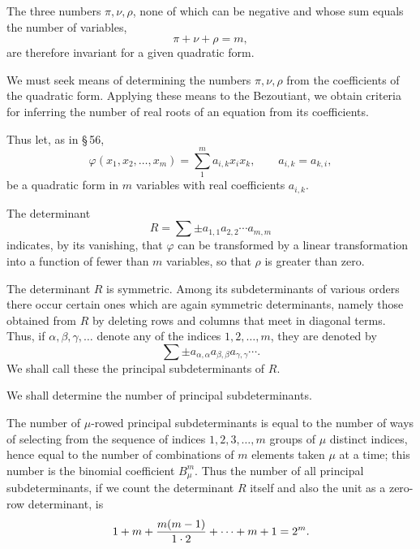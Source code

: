 \documentclass[11pt]{article}
\begin{document}
The three numbers $\pi,\nu,\rho$, none of which can be negative and whose sum equals the number of variables,
\begin{equation}
        \pi+\nu+\rho=m,
\tag{1}
\end{equation}
are therefore invariant for a given quadratic form.

We must seek means of determining the numbers $\pi,\nu,\rho$ from the coefficients of the quadratic form. Applying these means to the Bezoutiant, we obtain criteria for inferring the number of real roots of an equation from its coefficients.

Thus let, as in \S\,56,
\begin{equation}
        \varphi(x_1,x_2,\ldots,x_m)=\sum_{1}^{m}a_{i,k}x_ix_k,
        \qquad a_{i,k}=a_{k,i},
\tag{2}
\end{equation}
be a quadratic form in $m$ variables with real coefficients $a_{i,k}$.

The determinant
\begin{equation}
        R=\sum \pm a_{1,1}a_{2,2}\cdots a_{m,m}
\tag{3}
\end{equation}
indicates, by its vanishing, that $\varphi$ can be transformed by a linear transformation into a function of fewer than $m$ variables, so that $\rho$ is greater than zero.

The determinant $R$ is symmetric. Among its subdeterminants of various orders there occur certain ones which are again symmetric determinants, namely those obtained from $R$ by deleting rows and columns that meet in diagonal terms. Thus, if $\alpha,\beta,\gamma,\ldots$ denote any of the indices $1,2,
\ldots,m$, they are denoted by
\begin{equation}
        \sum\pm a_{\alpha,\alpha}a_{\beta,\beta}a_{\gamma,\gamma}\cdots.
\tag{4}
\end{equation}
We shall call these the principal subdeterminants of $R$.

We shall determine the number of principal subdeterminants.

The number of $\mu$-rowed principal subdeterminants is equal to the number of ways of selecting from the sequence of indices $1,2,3,\ldots,m$ groups of $\mu$ distinct indices, hence equal to the number of combinations of $m$ elements taken $\mu$ at a time; this number is the binomial coefficient $B^m_\mu$. Thus the number of all principal subdeterminants, if we count the determinant $R$ itself and also the unit as a zero-row determinant, is
\[
        1+m+{m(m-1)\over 1\cdot 2}+\cdots+m+1=2^m.
\]
\end{document}
